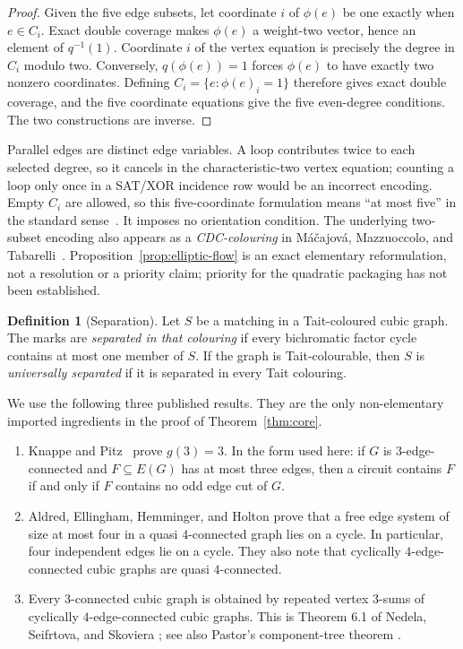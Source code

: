\documentclass[11pt]{article}
\theoremstyle{definition}
\newtheorem{definition}[theorem]{Definition}
\theoremstyle{remark}
\begin{document}
\begin{proof}
Given the five edge subsets, let coordinate \(i\) of \(\phi(e)\) be
one exactly when \(e\in C_i\).  Exact double coverage makes
\(\phi(e)\) a weight-two vector, hence an element of \(q^{-1}(1)\).
Coordinate \(i\) of the vertex equation is precisely the degree in
\(C_i\) modulo two.  Conversely, \(q(\phi(e))=1\) forces
\(\phi(e)\) to have exactly two nonzero coordinates.  Defining
\(C_i=\{e:\phi(e)_i=1\}\) therefore gives exact double coverage, and
the five coordinate equations give the five even-degree conditions.
The two constructions are inverse.
\end{proof}

Parallel edges are distinct edge variables.  A loop contributes twice
to each selected degree, so it cancels in the characteristic-two
vertex equation; counting a loop only once in a SAT/XOR incidence row
would be an incorrect encoding.  Empty \(C_i\) are allowed, so this
five-coordinate formulation means ``at most five'' in the standard
sense~\cite{Zhang2012,Oum2026}.  It imposes no orientation condition.
The underlying two-subset encoding also appears as a
\emph{CDC-colouring} in M\'a\v cajov\'a, Mazzuoccolo, and
Tabarelli~\cite[Definition 3.1]{MacajovaEtAl2026}.
Proposition~\ref{prop:elliptic-flow} is an exact elementary
reformulation, not a resolution or a priority claim; priority for the
quadratic packaging has not been established.

\begin{definition}[Separation]
Let \(S\) be a matching in a Tait-coloured cubic graph.  The marks are
\emph{separated in that colouring} if every bichromatic factor cycle
contains at most one member of \(S\).  If the graph is Tait-colourable,
then \(S\) is \emph{universally separated} if it is separated in every
Tait colouring.
\end{definition}

We use the following three published results.  They are the only
non-elementary imported ingredients in the proof of
Theorem~\ref{thm:core}.

\begin{enumerate}[label=(I\arabic*),leftmargin=2.8em]
\item\label{imp:kp}
  Knappe and Pitz~\cite[Fact 5.4]{KnappePitz2020} prove \(g(3)=3\).
  In the form used here: if \(G\) is 3-edge-connected and
  \(F\subseteq E(G)\) has at most three edges, then a circuit contains
  \(F\) if and only if \(F\) contains no odd edge cut of \(G\).
\item\label{imp:aeeh}
  Aldred, Ellingham, Hemminger, and Holton
  \cite[Theorem 3.3]{AldredEtAl1997} prove that a free edge system of
  size at most four in a quasi \(4\)-connected graph lies on a cycle.
  In particular, four independent edges lie on a cycle.  They also
  note that cyclically \(4\)-edge-connected cubic graphs are quasi
  \(4\)-connected.
\item\label{imp:decomp}
  Every 3-connected cubic graph is obtained by repeated vertex
  3-sums of cyclically \(4\)-edge-connected cubic graphs.  This is
  Theorem 6.1 of Nedela, Seifrtova, and Skoviera
  \cite{NedelaEtAl2024}; see also Pastor's component-tree theorem
  \cite{Pastor2018}.
\end{enumerate}
\end{document}
